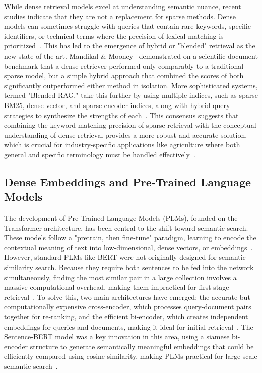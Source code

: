 \documentclass[journal]{./IEEE/IEEEtran}
\begin{document}
While dense retrieval models excel at understanding semantic nuance, recent studies indicate that they are not a replacement for sparse methods. Dense models can sometimes struggle with queries that contain rare keywords, specific identifiers, or technical terms where the precision of lexical matching is prioritized~\cite{sawarkar_blended_2024}. This has led to the emergence of hybrid or "blended" retrieval as the new state-of-the-art. Mandikal \& Mooney~\cite{mandikal_sparse_2024} demonstrated on a scientific document benchmark that a dense retriever performed only comparably to a traditional sparse model, but a simple hybrid approach that combined the scores of both significantly outperformed either method in isolation. More sophisticated systems, termed "Blended RAG," take this further by using multiple indices, such as sparse BM25, dense vector, and sparse encoder indices, along with hybrid query strategies to synthesize the strengths of each~\cite{sawarkar_blended_2024}. This consensus suggests that combining the keyword-matching precision of sparse retrieval with the conceptual understanding of dense retrieval provides a more robust and accurate solution, which is crucial for industry-specific applications like agriculture where both general and specific terminology must be handled effectively~\cite{balaguer_rag_2024}.

\subsection{Dense Embeddings and Pre-Trained Language Models}
The development of Pre-Trained Language Models (PLMs), founded on the Transformer architecture, has been central to the shift toward semantic search. These models follow a "pretrain, then fine-tune" paradigm, learning to encode the contextual meaning of text into low-dimensional, dense vectors, or embeddings~\cite{zhao_dense_2024}. However, standard PLMs like BERT were not originally designed for semantic similarity search. Because they require both sentences to be fed into the network simultaneously, finding the most similar pair in a large collection involves a massive computational overhead, making them impractical for first-stage retrieval~\cite{reimers_sentence-bert_2019}. To solve this, two main architectures have emerged: the accurate but computationally expensive cross-encoder, which processes query-document pairs together for re-ranking, and the efficient bi-encoder, which creates independent embeddings for queries and documents, making it ideal for initial retrieval~\cite{zhao_dense_2024}. The Sentence-BERT model was a key innovation in this area, using a siamese bi-encoder structure to generate semantically meaningful embeddings that could be efficiently compared using cosine similarity, making PLMs practical for large-scale semantic search~\cite{reimers_sentence-bert_2019}.
\end{document}
